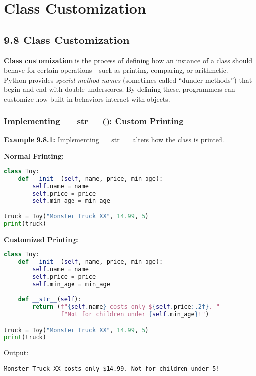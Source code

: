 \chapter{Class Customization}

\section{9.8 Class Customization}

\textbf{Class customization} is the process of defining how an instance of a class should behave
for certain operations—such as printing, comparing, or arithmetic.  
Python provides \textit{special method names} (sometimes called “dunder methods”) that begin
and end with double underscores.  
By defining these, programmers can customize how built-in behaviors interact with objects.

\subsection*{Implementing \_\_str\_\_(): Custom Printing}

\noindent\textbf{Example 9.8.1:} Implementing \_\_str\_\_ alters how the class is printed.

\begin{multicols}{2}
\textbf{Normal Printing:}
\begin{lstlisting}[language=Python]
class Toy:
    def __init__(self, name, price, min_age):
        self.name = name
        self.price = price
        self.min_age = min_age

truck = Toy("Monster Truck XX", 14.99, 5)
print(truck)
\end{lstlisting}

\columnbreak
\textbf{Customized Printing:}
\begin{lstlisting}[language=Python]
class Toy:
    def __init__(self, name, price, min_age):
        self.name = name
        self.price = price
        self.min_age = min_age

    def __str__(self):
        return (f"{self.name} costs only ${self.price:.2f}. "
                f"Not for children under {self.min_age}!")

truck = Toy("Monster Truck XX", 14.99, 5)
print(truck)
\end{lstlisting}
\end{multicols}

\noindent Output:
\begin{verbatim}
Monster Truck XX costs only $14.99. Not for children under 5!
\end{verbatim}

